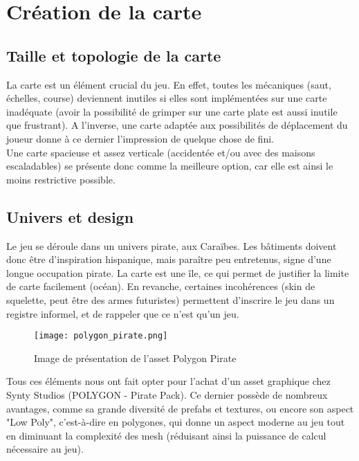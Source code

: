 \documentclass[../doc.tex]{subfiles}
\begin{document}
    \section{Création de la carte}

    \subsection{Taille et topologie de la carte}
    
    La carte est un élément crucial du jeu. En effet, toutes les mécaniques 
    (saut, échelles, course)
    deviennent inutiles si elles sont implémentées sur une carte inadéquate (avoir la 
    possibilité de grimper sur une carte plate est aussi inutile que frustrant).
    A l'inverse, une carte adaptée aux possibilités de déplacement du joueur donne à ce dernier
    l'impression de quelque chose de fini.
    \\

    Une carte spacieuse et assez verticale (accidentée et/ou avec des maisons escaladables)
    se présente donc comme la meilleure option, car elle est ainsi le moins restrictive possible.

    \subsection{Univers et design}

    Le jeu se déroule dans un univers pirate, aux Caraïbes.
    Les bâtiments doivent donc être d'inspiration hispanique,
    mais paraître peu entretenus, signe d'une longue occupation 
    pirate. La carte est une île, ce qui permet de justifier
    la limite de carte facilement (océan). En revanche, certaines 
    incohérences (skin de squelette, peut être des armes futuristes)
    permettent d'inscrire le jeu dans un registre informel, et de 
    rappeler que ce n'est qu'un jeu.
    \\

    \begin{figure}[!hbt]
        \centering
        \texttt{[image: polygon\_pirate.png]}
        \caption{Image de présentation de l'asset Polygon Pirate}
    \end{figure}


    Tous ces éléments nous ont fait opter pour l'achat d'un asset graphique chez 
    Synty Studios (POLYGON - Pirate Pack).
    Ce dernier possède de nombreux avantages, comme sa grande diversité de prefabs et 
    textures, ou encore son aspect "Low Poly", 
    c'est-à-dire en polygones, qui donne un aspect moderne au jeu tout en diminuant la 
    complexité des mesh (réduisant ainsi la 
    puissance de calcul nécessaire au jeu).
    \\ 
\end{document}
